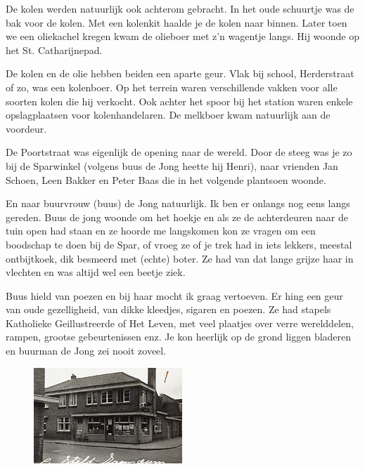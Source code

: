 \documentclass[12pt,twoside, openright]{memoir}
\begin{document}
De kolen werden natuurlijk ook achterom gebracht. In het oude schuurtje was de bak voor de kolen. Met een kolenkit haalde je de kolen naar binnen. Later toen we een oliekachel kregen kwam de olieboer met z’n wagentje langs. Hij woonde op het St. Catharijnepad.

De kolen en de olie hebben beiden een aparte geur. Vlak bij school, Herderstraat of zo, was een kolenboer. Op het terrein waren verschillende vakken voor alle soorten kolen die hij verkocht. Ook achter het spoor bij het station waren enkele opslagplaatsen voor kolenhandelaren. De melkboer kwam natuurlijk aan de voordeur.

De Poortstraat was eigenlijk de opening naar de wereld. Door de steeg was je zo bij de Sparwinkel (volgens buus de Jong heette hij Henri), naar vrienden Jan Schoen, Leen Bakker en Peter Baas die in het volgende plantsoen woonde. 

En naar buurvrouw (buus) de Jong natuurlijk. Ik ben er onlangs nog eens langs gereden. Buus de jong woonde om het hoekje en als ze de achterdeuren naar de tuin open had staan en ze hoorde me langskomen kon ze vragen om een boodschap te doen bij de Spar, of vroeg ze of je trek had in iets lekkers, meestal ontbijtkoek, dik besmeerd met (echte) boter. Ze had van dat lange grijze haar in vlechten en was altijd wel een beetje ziek.

Buus hield van poezen en bij haar mocht ik graag vertoeven. Er hing een geur van oude gezelligheid, van dikke kleedjes, sigaren en poezen. Ze had stapels Katholieke Geillustreerde of Het Leven, met veel plaatjes over verre werelddelen, rampen, grootse gebeurtenissen enz. Je kon heerlijk op de grond liggen bladeren en buurman de Jong zei nooit zoveel. 


\begin{figure}
\includegraphics[width=\textwidth]{img/ch5/Spar-Poortstr}
\caption*{\footnotesize }
\end{figure}
\end{document}
